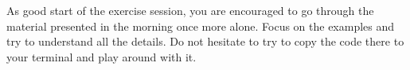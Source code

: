 
    As good start of the exercise session, you are encouraged to go through the material presented in the morning once more alone.
    Focus on the examples and try to understand all the details.
    Do not hesitate to try to copy the code there to your terminal and play around with it.
\EndExercise[DarkGreen]